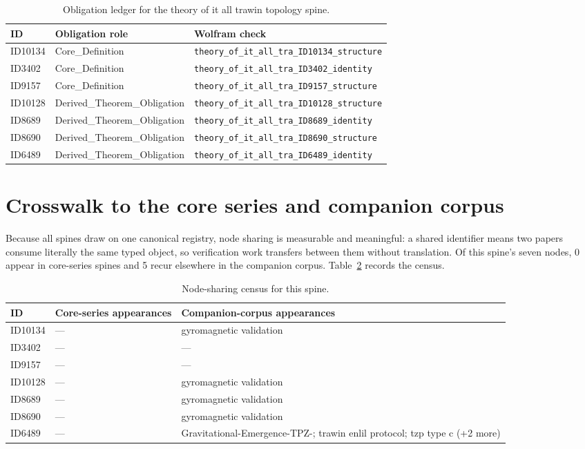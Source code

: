 \documentclass[11pt]{article}
\theoremstyle{remark}
\begin{document}
\begin{table}[ht]
\centering
\small
\caption{Obligation ledger for the theory of it all trawin topology spine.}
\label{tab:obligations}
\begin{tabular}{llp{6.2cm}}
\toprule
ID & Obligation role & Wolfram check \\
\midrule
ID10134 & Core\_Definition & \texttt{theory\_of\_it\_all\_tra\_ID10134\_structure} \\
ID3402 & Core\_Definition & \texttt{theory\_of\_it\_all\_tra\_ID3402\_identity} \\
ID9157 & Core\_Definition & \texttt{theory\_of\_it\_all\_tra\_ID9157\_structure} \\
ID10128 & Derived\_Theorem\_Obligation & \texttt{theory\_of\_it\_all\_tra\_ID10128\_structure} \\
ID8689 & Derived\_Theorem\_Obligation & \texttt{theory\_of\_it\_all\_tra\_ID8689\_identity} \\
ID8690 & Derived\_Theorem\_Obligation & \texttt{theory\_of\_it\_all\_tra\_ID8690\_structure} \\
ID6489 & Derived\_Theorem\_Obligation & \texttt{theory\_of\_it\_all\_tra\_ID6489\_identity} \\
\bottomrule
\end{tabular}
\end{table}

\section{Crosswalk to the core series and companion corpus}
\label{sec:crosswalk}

Because all spines draw on one canonical registry, node sharing is measurable and meaningful: a shared identifier means two papers consume literally the same typed object, so verification work transfers between them without translation. Of this spine's seven nodes, 0 appear in core-series spines and 5 recur elsewhere in the companion corpus. Table~\ref{tab:crosswalk} records the census.

\begin{table}[ht]
\centering
\small
\caption{Node-sharing census for this spine.}
\label{tab:crosswalk}
\begin{tabular}{lp{4.4cm}p{6.6cm}}
\toprule
ID & Core-series appearances & Companion-corpus appearances \\
\midrule
ID10134 & --- & gyromagnetic validation \\
ID3402 & --- & --- \\
ID9157 & --- & --- \\
ID10128 & --- & gyromagnetic validation \\
ID8689 & --- & gyromagnetic validation \\
ID8690 & --- & gyromagnetic validation \\
ID6489 & --- & Gravitational-Emergence-TPZ-; trawin enlil protocol; tzp type c (+2 more) \\
\bottomrule
\end{tabular}
\end{table}
\end{document}
